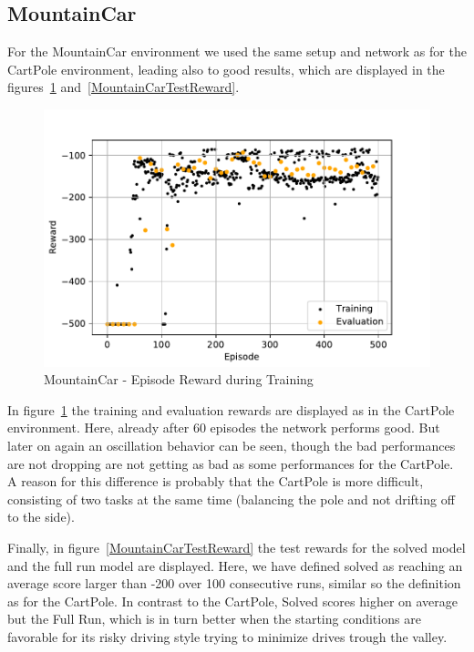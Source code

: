 \documentclass[
        a4paper,
        10pt,
        parskip = full,    %
    ]{scrartcl}
\begin{document}
\subsection{MountainCar}

For the MountainCar environment we used the same setup and network as for the
CartPole environment, leading also to good results, which are displayed in the
figures~\ref{MountainCarTrainEvalReward} and~\ref{MountainCarTestReward}.

\begin{figure}[H]
  \begin{center}
    \includegraphics{./images/MountainCar-v0/tb_train_eval_reward.pdf}
    \caption{MountainCar - Episode Reward during Training}
    \label{MountainCarTrainEvalReward}
  \end{center}
\end{figure}

In figure~\ref{MountainCarTrainEvalReward} the training and evaluation rewards
are displayed as in the CartPole environment. Here, already after 60
episodes the network performs good. But later on again an oscillation behavior
can be seen, though the bad performances are not dropping are not getting as bad
as some performances for the CartPole. A reason for this difference is probably
that the CartPole is more difficult, consisting of two tasks at the same time
(balancing the pole and not drifting off to the side).

Finally, in figure~\ref{MountainCarTestReward} the test rewards for the
solved model and the full run model are displayed. Here, we have defined solved
as reaching an average score larger than -200 over 100 consecutive runs,
similar so the definition as for the CartPole. In contrast to the CartPole,
Solved scores higher on average but the Full Run, which is in turn better when
the starting conditions are favorable for its risky driving style trying to
minimize drives trough the valley.
\end{document}
